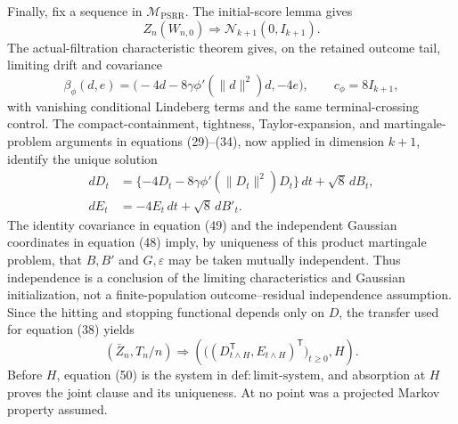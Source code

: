 Finally, fix a sequence in \(\mathcal M_{\mathrm{PSRR}}\). The initial-score lemma gives
\[
 Z_n(W_{n,0})\Rightarrow\mathcal N_{k+1}(0,I_{k+1}). \tag{48}
\]
The actual-filtration characteristic theorem gives, on the retained outcome tail, limiting drift and covariance
\[
 \beta_\phi(d,e)=
 \bigl(-4d-8\gamma\phi'(\|d\|^2)d,-4e\bigr),
 \qquad c_\phi=8I_{k+1}, \tag{49}
\]
with vanishing conditional Lindeberg terms and the same terminal-crossing control. The compact-containment, tightness, Taylor-expansion, and martingale-problem arguments in equations (29)--(34), now applied in dimension \(k+1\), identify the unique solution
\[
 \begin{split}
 dD_t&=\{-4D_t-8\gamma\phi'(\|D_t\|^2)D_t\}\,dt+\sqrt8\,dB_t,\\
 dE_t&=-4E_t\,dt+\sqrt8\,dB'_t.
 \end{split} \tag{50}
\]
The identity covariance in equation (49) and the independent Gaussian coordinates in equation (48) imply, by uniqueness of this product martingale problem, that \(B,B'\) and \(G,\varepsilon\) may be taken mutually independent. Thus independence is a conclusion of the limiting characteristics and Gaussian initialization, not a finite-population outcome--residual independence assumption. Since the hitting and stopping functional depends only on \(D\), the transfer used for equation (38) yields
\[
 (\bar Z_n,T_n/n)\Rightarrow
 \left(\bigl((D_{t\wedge H}^{\mathsf T},E_{t\wedge H})^{\mathsf T}\bigr)_{t\ge0},H\right). \tag{51}
\]
Before \(H\), equation (50) is the system in \(\mathrm{def{:}limit\mbox{-}system}\), and absorption at \(H\) proves the joint clause and its uniqueness. At no point was a projected Markov property assumed.
